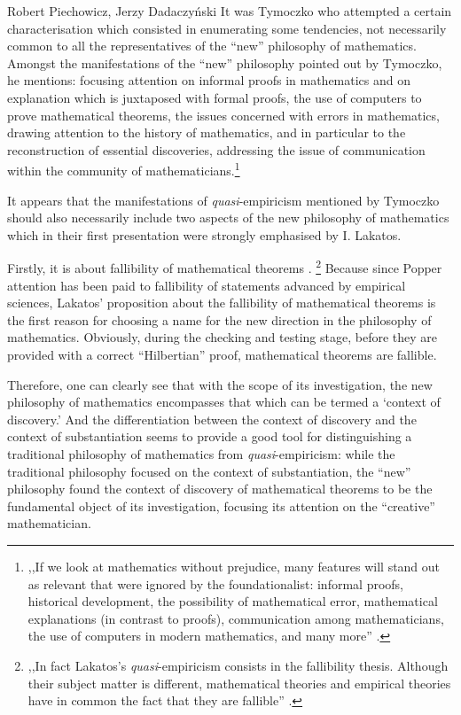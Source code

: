 \begin{artengenv}{Robert Piechowicz, Jerzy Dadaczyński}
It was Tymoczko who attempted a certain characterisation which consisted in enumerating some tendencies, not necessarily common to all the representatives of the ``new'' philosophy of mathematics. Amongst the manifestations of the ``new'' philosophy pointed out by Tymoczko, he mentions: focusing attention on informal proofs in mathematics and on explanation which is juxtaposed with formal proofs, the use of computers to prove mathematical theorems, the issues concerned with errors in mathematics, drawing attention to the history of mathematics, and in particular to the reconstruction of essential discoveries, addressing the issue of communication within the community of mathematicians.\footnote{,,If we look at mathematics without prejudice, many features will stand out as relevant that were ignored by the foundationalist: informal proofs, historical development, the possibility of mathematical error, mathematical explanations (in contrast to proofs), communication among mathematicians, the use of computers in modern mathematics, and many more''
\parencite[][p.xvi]{tymoczko_introduction_1986}.%
}

It appears that the manifestations of \textit{quasi}-empiricism mentioned by Tymoczko should also necessarily include two aspects of the new philosophy of mathematics which in their first presentation were strongly emphasised by I. Lakatos.

Firstly, it is about fallibility of mathematical theorems
\parencite[][p.139]{lakatos_proofs_1976}.%
\footnote{,,In fact Lakatos's \textit{quasi}-empiricism consists in the fallibility thesis. Although their subject matter is different, mathematical theories and empirical theories have in common the fact that they are fallible'' 
\parencite[][p.4]{koetsier_lakatos_1991}.%
} Because since Popper attention has been paid to fallibility of statements advanced by empirical sciences, Lakatos' proposition about the fallibility of mathematical theorems is the first reason for choosing a name for the new direction in the philosophy of mathematics. Obviously, during the checking and testing stage, before they are provided with a correct ``Hilbertian'' proof, mathematical theorems are fallible.

Therefore, one can clearly see that with the scope of its investigation, the new philosophy of mathematics encompasses that which can be termed a ‘context of discovery.' And the differentiation between the context of discovery and the context of substantiation seems to provide a good tool for distinguishing a traditional philosophy of mathematics from \textit{quasi}-empiricism: while the traditional philosophy focused on the context of substantiation, the ``new'' philosophy found the context of discovery of mathematical theorems to be the fundamental object of its investigation, focusing its attention on the ``creative'' mathematician.


\end{artengenv}

